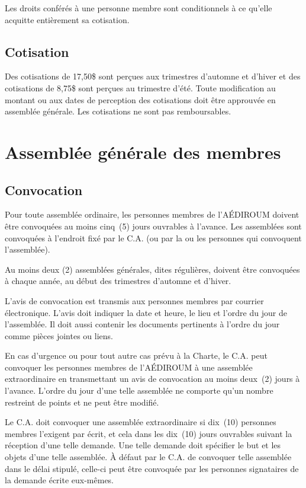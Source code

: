 \documentclass{aediroum}
\begin{document}
Les droits conférés à une personne membre sont conditionnels à ce qu'elle acquitte entièrement sa cotisation.

\subsection{Cotisation}\label{sec:cotisation}

Des cotisations de 17,50\$ sont perçues aux trimestres d’automne et d’hiver et des cotisations de 8,75\$ sont perçues au trimestre d’été. Toute modification au montant ou aux dates de perception des cotisations doit être approuvée en assemblée générale. Les cotisations ne sont pas remboursables.

\section{Assemblée générale des membres}\label{sec:assemblee-generale-des-membres}

\subsection{Convocation}\label{sec:convocation-generale}

Pour toute assemblée ordinaire, les personnes membres de l'AÉDIROUM doivent être convoquées au moins cinq~(5) jours ouvrables à l'avance. Les assemblées sont convoquées à l'endroit fixé par le C.A. (ou par la ou les personnes qui convoquent l'assemblée).

Au moins deux (2) assemblées générales, dites régulières, doivent être convoquées à chaque année, au début des trimestres d'automne et d'hiver.

L'avis de convocation est transmis aux personnes membres par courrier électronique. L'avis doit indiquer la date et heure, le lieu et l'ordre du jour de l'assemblée. Il doit aussi contenir les documents pertinents à l'ordre du jour comme pièces jointes ou liens.

En cas d'urgence ou pour tout autre cas prévu à la Charte, le C.A. peut convoquer les personnes membres de l'AÉDIROUM à une assemblée extraordinaire en transmettant un avis de convocation au moins deux~(2) jours à l'avance. L'ordre du jour d'une telle assemblée ne comporte qu'un nombre restreint de points et ne peut être modifié.

Le C.A. doit convoquer une assemblée extraordinaire si dix~(10) personnes membres l'exigent par écrit, et cela dans les dix~(10) jours ouvrables suivant la réception d'une telle demande. Une telle demande doit spécifier le but et les objets d'une telle assemblée. À défaut par le C.A. de convoquer telle assemblée dans le délai stipulé, celle-ci peut être convoquée par les personnes signataires de la demande écrite eux-mêmes.
\end{document}
